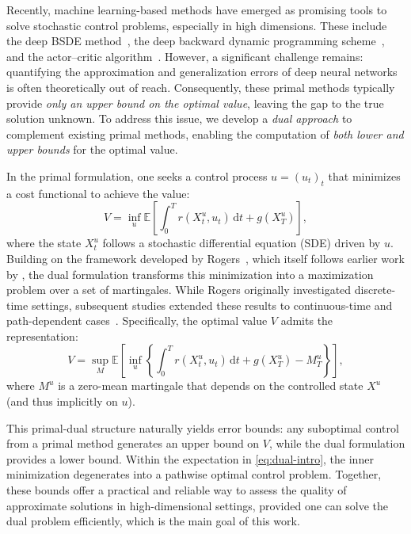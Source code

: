 \documentclass[11pt]{article}
\numberwithin{equation}{section}
\theoremstyle{plain}
\theoremstyle{definition}
\theoremstyle{remark}
\newcommand{\dd}{\mathrm{d}}
\begin{document}
Recently, machine learning-based methods have emerged as promising tools to solve stochastic control problems, especially in high dimensions. These include the deep BSDE method~\cite{E2017deepbsde}, the deep backward dynamic programming scheme~\cite{hure2020deep}, and the actor--critic algorithm~\cite{zhou2024solving}. However, a significant challenge remains: quantifying the approximation and generalization errors of deep neural networks is often theoretically out of reach. Consequently, these primal methods typically provide \emph{only an upper bound on the optimal value}, leaving the gap to the true solution unknown. To address this issue, we develop a \emph{dual approach} to complement existing primal methods, enabling the computation of \emph{both lower and upper bounds} for the optimal value.

In the primal formulation, one seeks a control process $u = (u_t)_{t}$ that minimizes a cost functional to achieve the value: 
\begin{equation*}
    V = \inf_u \mathbb{E}\left[ \int_0^T r(X_t^u, u_t)\,\dd t + g(X_T^u) \right], 
\end{equation*}
where the state $X_t^u$ follows a stochastic differential equation (SDE) driven by $u$. Building on the framework developed by Rogers~\cite{rogers2007pathwise}, which itself follows earlier work by \cite{ha1992deterministic}, the dual formulation transforms this minimization into a maximization problem over a set of martingales. While Rogers originally investigated discrete-time settings, subsequent studies extended these results to continuous-time and path-dependent cases~\cite{diehl2017stochastic, henry2016dual}. Specifically, the optimal value $V$ admits the representation:
\begin{equation} \label{eq:dual-intro}
    V = \sup_{M} \mathbb{E}\left[ \inf_{u} \left\{ \int_0^T r(X_t^u, u_t)\,\dd t + g(X_T^u) - M_T^u \right\} \right],
\end{equation}
where $M^u$ is a zero-mean martingale that depends on the controlled state $X^u$ (and thus implicitly on $u$). 

This primal-dual structure naturally yields error bounds: any suboptimal control from a primal method generates an upper bound on $V$, while the dual formulation provides a lower bound. Within the expectation in \eqref{eq:dual-intro}, the inner minimization degenerates into a pathwise optimal control problem. Together, these bounds offer a practical and reliable way to assess the quality of approximate solutions in high-dimensional settings, provided one can solve the dual problem efficiently, which is the main goal of this work.
\end{document}
